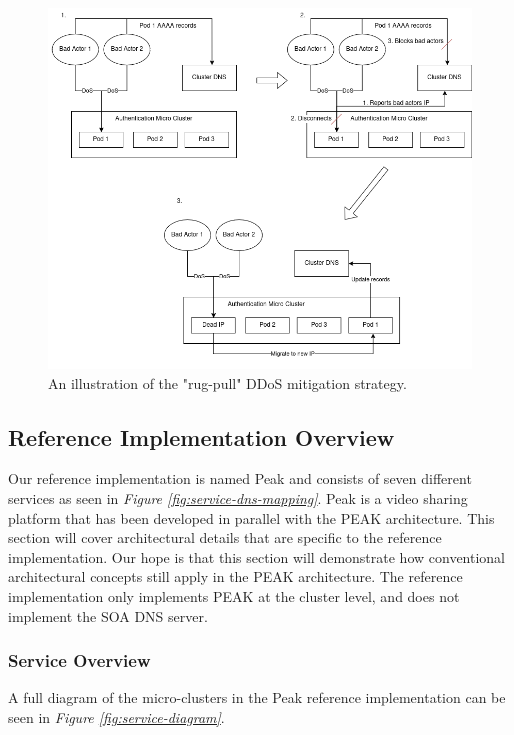 \documentclass[12pt]{article}
\begin{document}
\begin{figure}[H]
    \includegraphics[width=1\textwidth]{bad-actors.drawio.png}
    \caption{An illustration of the "rug-pull" DDoS mitigation strategy.}
    \label{fig:rug-pull}
\end{figure}

\subsection{Reference Implementation Overview}
Our reference implementation is named Peak and consists of seven different services 
as seen in \textit{Figure \ref{fig:service-dns-mapping}}. Peak is a video sharing platform
that has been developed in parallel with the PEAK architecture. This section will 
cover architectural details that are specific to the reference implementation.
Our hope is that this section will demonstrate how conventional architectural concepts 
still apply in the PEAK architecture. The reference implementation only implements
PEAK at the cluster level, and does not implement the SOA DNS server.

\subsubsection{Service Overview}
A full diagram of the micro-clusters in the Peak reference implementation
can be seen in \textit{Figure \ref{fig:service-diagram}}.
\end{document}
